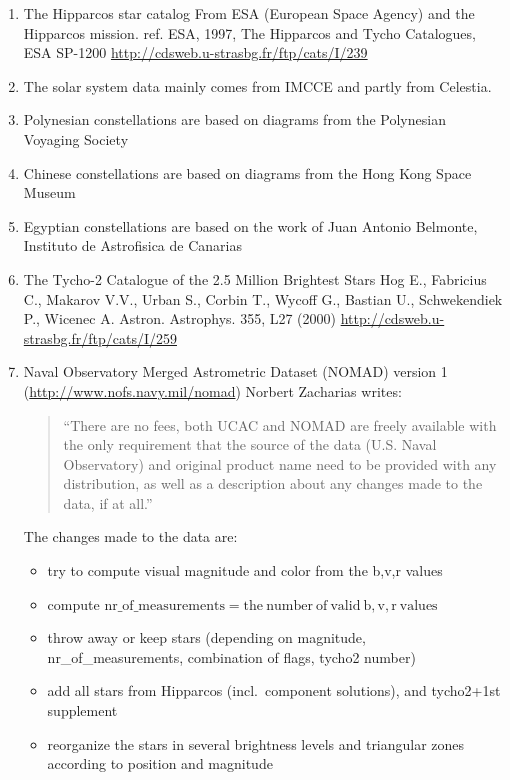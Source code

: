 \begin{enumerate}
\item The Hipparcos star catalog
    From ESA (European Space Agency) and the Hipparcos mission. ref. ESA, 1997, The Hipparcos and Tycho Catalogues, ESA SP-1200 \url{http://cdsweb.u-strasbg.fr/ftp/cats/I/239}
\item The solar system data mainly comes from IMCCE and partly from Celestia.
\item Polynesian constellations are based on diagrams from the Polynesian Voyaging Society
\item Chinese constellations are based on diagrams from the Hong Kong Space Museum
\item Egyptian constellations are based on the work of Juan Antonio Belmonte, Instituto de Astrofisica de Canarias
\item The Tycho-2 Catalogue of the 2.5 Million Brightest Stars Hog E., Fabricius C., Makarov V.V., Urban S., Corbin T., Wycoff G., Bastian U., Schwekendiek P., Wicenec A.
    Astron. Astrophys. 355, L27 (2000)
    \url{http://cdsweb.u-strasbg.fr/ftp/cats/I/259}
\item Naval Observatory Merged Astrometric Dataset (NOMAD) version 1 (\url{http://www.nofs.navy.mil/nomad})
    Norbert Zacharias writes:
	\begin{quotation}
    ``There are no fees, both UCAC and NOMAD are freely available with the only requirement that the source of the data (U.S.
    Naval Observatory) and original product name need to be provided with any distribution, as well as a description about any
    changes made to the data, if at all.''
	\end{quotation}
    The changes made to the data are:
	\begin{itemize}
    \item try to compute visual magnitude and color from the b,v,r values
    \item compute $\mathrm{nr\_of\_measurements} = \mathrm{the\ number\ of\ valid\ b,v,r\ values}$
    \item throw away or keep stars (depending on magnitude, nr\_of\_measurements, combination of flags, tycho2 number)
    \item add all stars from Hipparcos (incl.\ component solutions), and tycho2+1st supplement
    \item reorganize the stars in several brightness levels and triangular zones according to position and magnitude

\end{itemize}
\end{enumerate}
